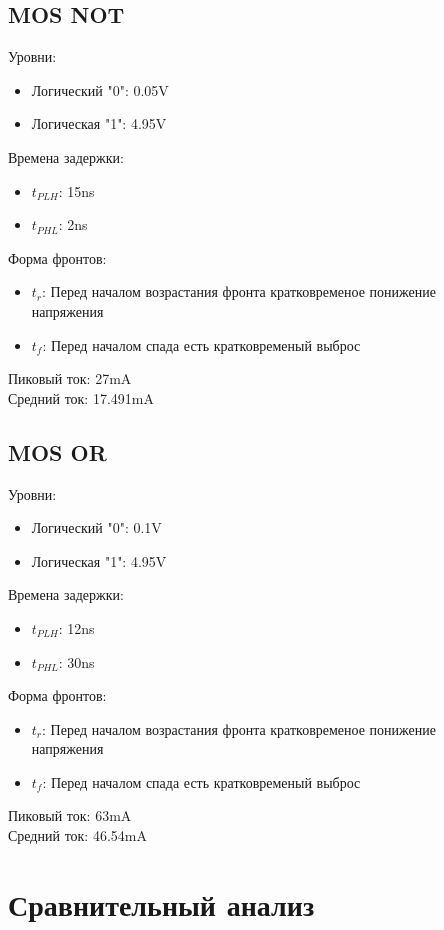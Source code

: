 \subsection{MOS NOT}
Уровни:
\begin{itemize}
    \item Логический "0": 0.05V
    \item Логическая "1": 4.95V
\end{itemize}
Времена задержки:
\begin{itemize}
    \item $t_{PLH}$: 15ns
    \item $t_{PHL}$: 2ns
\end{itemize}
Форма фронтов:
\begin{itemize}
    \item $t_{r}$: Перед началом возрастания фронта кратковременое понижение напряжения
    \item $t_{f}$: Перед началом спада есть кратковременый выброс
\end{itemize}
Пиковый ток: 27mA\\
Средний ток: 17.491mA


\subsection{MOS OR}
Уровни:
\begin{itemize}
    \item Логический "0": 0.1V
    \item Логическая "1": 4.95V
\end{itemize}
Времена задержки:
\begin{itemize}
    \item $t_{PLH}$: 12ns
    \item $t_{PHL}$: 30ns
\end{itemize}
Форма фронтов:
\begin{itemize}
    \item $t_{r}$: Перед началом возрастания фронта кратковременое понижение напряжения
    \item $t_{f}$: Перед началом спада есть кратковременый выброс
\end{itemize}
Пиковый ток: 63mA\\
Средний ток: 46.54mA


\section{Сравнительный анализ}

